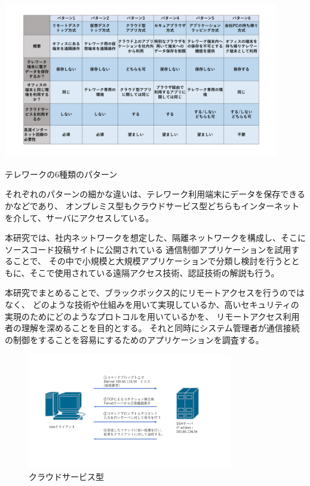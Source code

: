 \documentclass[12pt,a4paper,titlepage]{jsarticle}
\begin{document}
\begin{table}[h]
    \centering
    \includegraphics*[width=0.9\textwidth,page=1]{graphs/telework_list.pdf}
    \caption{テレワークの6種類のパターン}
    \label{telework_table}
\end{table}

それぞれのパターンの細かな違いは、テレワーク利用端末にデータを保存できるかなどであり、
オンプレミス型もクラウドサービス型どちらもインターネットを介して、サーバにアクセスしている。
\par 本研究では、社内ネットワークを想定した、隔離ネットワークを構成し、そこにソースコード投稿サイトに公開されている
通信制御アプリケーションを試用することで、
その中で小規模と大規模アプリケーションで分類し検討を行うとともに、そこで使用されている遠隔アクセス技術、認証技術の解説も行う。

本研究でまとめることで、ブラックボックス的にリモートアクセスを行うのではなく、
どのような技術や仕組みを用いて実現しているか、高いセキュリティの実現のためにどのようなプロトコルを用いているかを、
リモートアクセス利用者の理解を深めることを目的とする。
それと同時にシステム管理者が通信接続の制御をすることを容易にするためのアプリケーションを調査する。



\begin{figure}[h]
    \centering
    \includegraphics*[width=0.8\textwidth,page=14]{graphs/network_archtecture.pdf}
    \caption{ クラウドサービス型}
    \label{cloud_graph}
\end{figure}
\end{document}
